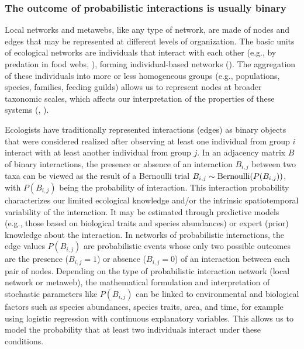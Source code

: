 \subsubsection{The outcome of probabilistic interactions is usually binary}

Local networks and metawebs, like any type of network, are made of nodes and
edges that may be represented at different levels of organization. The basic
units of ecological networks are individuals that interact with each other
(e.g., by predation in food webs, \cite{Elton2001Animal}), forming
individual-based networks (\cite{Melian2011Ecoevolutionary}). The aggregation of
these individuals into more or less homogeneous groups (e.g., populations,
species, families, feeding guilds) allows us to represent nodes at broader
taxonomic scales, which affects our interpretation of the properties of these
systems (\cite{Guimaraes2020Structure}, \cite{Hemprich-Bennett2021Assessing}). 

Ecologists have traditionally represented interactions (edges) as binary objects
that were considered realized after observing at least one individual from group
$i$ interact with at least another individual from group $j$. In an adjacency
matrix $B$ of binary interactions, the presence or absence of an interaction
$B_{i,j}$ between two taxa can be viewed as the result of a Bernoulli trial
$B_{i, j} \sim {\rm Bernoulli}(P(B_{i, j}))$, with $P(B_{i, j})$ being the
probability of interaction. This interaction probability characterizes our
limited ecological knowledge and/or the intrinsic spatiotemporal variability of
the interaction. It may be estimated through predictive models (e.g., those
based on biological traits and species abundances) or expert (prior) knowledge
about the interaction. In networks of probabilistic interactions, the edge
values $P(B_{i, j})$ are probabilistic events whose only two possible outcomes
are the presence ($B_{i, j} = 1$) or absence ($B_{i, j} = 0$) of an interaction
between each pair of nodes. Depending on the type of probabilistic interaction
network (local network or metaweb), the mathematical formulation and
interpretation of stochastic parameters like $P(B_{i, j})$ can be linked to
environmental and biological factors such as species abundances, species traits,
area, and time, for example using logistic regression with continuous
explanatory variables. This allows us to model the probability that at least two
individuals interact under these conditions. 

